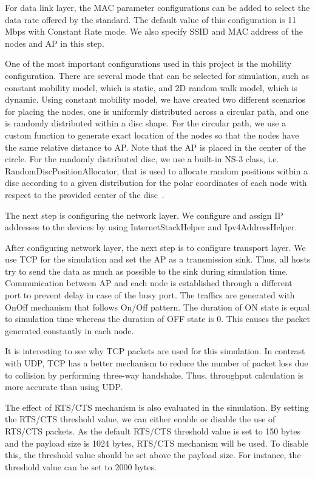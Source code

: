 For data link layer, the MAC parameter configurations can be added to select the  data rate offered by the standard. The default value of this configuration is 11 Mbps with Constant Rate mode. We also specify SSID and MAC address of the nodes and AP in this step.

One of the most important configurations used in this project is the mobility configuration. There are several mode that can be selected for simulation, such as constant mobility model, which is static, and 2D random walk model, which is dynamic. Using constant mobility model, we have created two different scenarios for placing the nodes, one is uniformly distributed across a circular path, and one is randomly distributed within a disc shape. For the circular path, we use a custom function to generate exact location of the nodes so that the nodes have the same relative distance to AP. Note that the AP is placed in the center of the circle. For the randomly distributed disc, we use a built-in NS-3 class, i.e. RandomDiscPositionAllocator, that is used to allocate random positions within a disc according to a given distribution for the polar coordinates of each node with respect to the provided center of the disc~\cite{ns32016}. 

The next step is configuring the network layer. We configure and assign IP addresses to the devices by using InternetStackHelper and Ipv4AddressHelper.

After configuring network layer, the next step is to configure transport layer. We use TCP for the simulation and set the AP as a transmission sink. Thus, all hosts try to send the data as much as possible to the sink during simulation time. Communication between AP and each node is established through a different port to prevent delay in case of the busy port. The traffics are generated with OnOff mechanism that follows On/Off pattern. The duration of ON state is equal to simulation time whereas the duration of OFF state is 0. This causes the packet generated constantly in each node.

It is interesting to see why TCP packets are used for this simulation. In contrast with UDP, TCP has a better mechanism to reduce the number of packet loss due to collision by performing three-way handshake. Thus, throughput calculation is more accurate than using UDP.

The effect of RTS/CTS mechanism is also evaluated in the simulation. By setting the RTS/CTS threshold value, we can either enable or disable the use of RTS/CTS packets. As the default RTS/CTS threshold value is set to 150 bytes and the payload size is 1024 bytes, RTS/CTS mechanism will be used. To disable this, the threshold value should be set above the payload size. For instance, the threshold value can be set to 2000 bytes.


